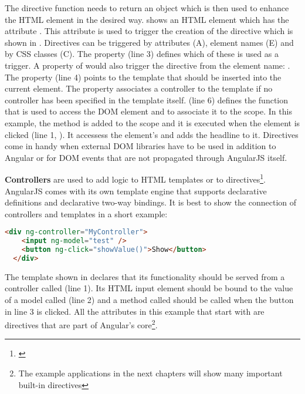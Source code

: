 The directive function needs to return an object which is then used to enhance the HTML element in the desired way.  shows an HTML element which has the attribute . This attribute is used to trigger the creation of the directive which is shown in . Directives can be triggered by attributes (A), element names (E) and by CSS classes (C). The  property (line 3) defines which of these is used as a trigger. A  property of  would also trigger the directive from the element name: . The  property (line 4) points to the template that should be inserted into the current element. The  property associates a controller to the template if no controller has been specified in the template itself.  (line 6) defines the function that is used to access the DOM element and to associate it to the scope. In this example, the method  is added to the scope and it is executed when the  element is clicked (line 1, ). It accessess the element's  and adds the headline  to it. Directives come in handy when external DOM libraries have to be used in addition to Angular or for DOM events that are not propagated through AngularJS itself. 

\textbf{Controllers} are used to add logic to HTML templates or to directives\footnote{\cite[p. 25ff]{lerner2013ngbook}}. AngularJS comes with its own template engine that supports declarative definitions and declarative two-way bindings. It is best to show the connection of controllers and templates in a short example:

\begin{lstlisting}[language=HTML, caption=A simple AngularJS template, label=lst:angular-template]
  <div ng-controller="MyController">
    <input ng-model="test" />
    <button ng-click="showValue()">Show</button>
  </div>
\end{lstlisting}

The template shown in  declares that its functionality should be served from a controller called  (line 1). Its HTML input element should be bound to the value of a model called  (line 2) and a method called  should be called when the button in line 3 is clicked. All the attributes in this example that start with  are directives that are part of Angular's core\footnote{The example applications in the next chapters will show many important built-in directives}.

